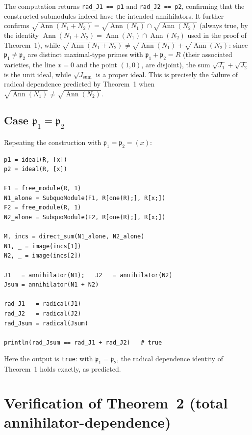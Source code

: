\documentclass[11pt]{article}
\begin{document}
The computation returns \texttt{rad\_J1 == p1} and \texttt{rad\_J2 ==
p2}, confirming that the constructed submodules indeed have the intended
annihilators. It further confirms
$\sqrt{\operatorname{Ann}(N_1+N_2)}=\sqrt{\operatorname{Ann}(N_1)}\cap
\sqrt{\operatorname{Ann}(N_2)}$ (always true, by the identity
$\operatorname{Ann}(N_1+N_2)=\operatorname{Ann}(N_1)\cap
\operatorname{Ann}(N_2)$ used in the proof of Theorem~1), while
$\sqrt{\operatorname{Ann}(N_1+N_2)} \neq
\sqrt{\operatorname{Ann}(N_1)}+\sqrt{\operatorname{Ann}(N_2)}$: since
$\mathfrak p_1\neq \mathfrak p_2$ are distinct maximal-type primes with
$\mathfrak p_1+\mathfrak p_2 = R$ (their associated varieties, the line
$x=0$ and the point $(1,0)$, are disjoint), the sum $\sqrt{J_1}+\sqrt{J_2}$
is the unit ideal, while $\sqrt{J_{\mathrm{sum}}}$ is a proper ideal. This
is precisely the failure of radical dependence predicted by Theorem~1
when $\sqrt{\operatorname{Ann}(N_1)}\neq \sqrt{\operatorname{Ann}(N_2)}$.

\subsection{Case $\mathfrak p_1 = \mathfrak p_2$}

Repeating the construction with $\mathfrak p_1=\mathfrak p_2=(x)$:

\begin{lstlisting}
p1 = ideal(R, [x])
p2 = ideal(R, [x])

F1 = free_module(R, 1)
N1_alone = SubquoModule(F1, R[one(R);], R[x;])
F2 = free_module(R, 1)
N2_alone = SubquoModule(F2, R[one(R);], R[x;])

M, incs = direct_sum(N1_alone, N2_alone)
N1, _ = image(incs[1])
N2, _ = image(incs[2])

J1   = annihilator(N1);   J2   = annihilator(N2)
Jsum = annihilator(N1 + N2)

rad_J1   = radical(J1)
rad_J2   = radical(J2)
rad_Jsum = radical(Jsum)

println(rad_Jsum == rad_J1 + rad_J2)   # true
\end{lstlisting}

Here the output is \texttt{true}: with $\mathfrak p_1=\mathfrak p_2$, the
radical dependence identity of Theorem~1 holds exactly, as predicted.

\section{Verification of Theorem~2 (total annihilator-dependence)}
\label{sec:thm2}
\end{document}
